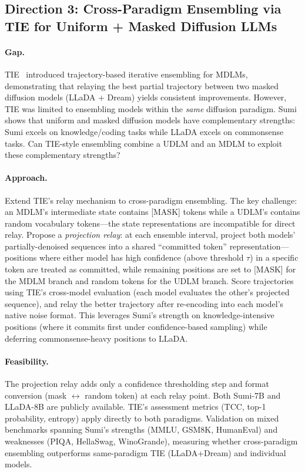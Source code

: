 \documentclass[11pt,a4paper]{article}
\begin{document}
\subsection{Direction 3: Cross-Paradigm Ensembling via TIE for Uniform + Masked Diffusion LLMs}

\paragraph{Gap.} TIE~\cite{yun2026tie} introduced trajectory-based iterative ensembling for MDLMs, demonstrating that relaying the best partial trajectory between two masked diffusion models (LLaDA + Dream) yields consistent improvements. However, TIE was limited to ensembling models within the \emph{same} diffusion paradigm. Sumi shows that uniform and masked diffusion models have complementary strengths: Sumi excels on knowledge/coding tasks while LLaDA excels on commonsense tasks. Can TIE-style ensembling combine a UDLM and an MDLM to exploit these complementary strengths?

\paragraph{Approach.} Extend TIE's relay mechanism to cross-paradigm ensembling. The key challenge: an MDLM's intermediate state contains [MASK] tokens while a UDLM's contains random vocabulary tokens---the state representations are incompatible for direct relay. Propose a \emph{projection relay}: at each ensemble interval, project both models' partially-denoised sequences into a shared ``committed token'' representation---positions where either model has high confidence (above threshold $\tau$) in a specific token are treated as committed, while remaining positions are set to [MASK] for the MDLM branch and random tokens for the UDLM branch. Score trajectories using TIE's cross-model evaluation (each model evaluates the other's projected sequence), and relay the better trajectory after re-encoding into each model's native noise format. This leverages Sumi's strength on knowledge-intensive positions (where it commits first under confidence-based sampling) while deferring commonsense-heavy positions to LLaDA.

\paragraph{Feasibility.} The projection relay adds only a confidence thresholding step and format conversion (mask $\leftrightarrow$ random token) at each relay point. Both Sumi-7B and LLaDA-8B are publicly available. TIE's assessment metrics (TCC, top-1 probability, entropy) apply directly to both paradigms. Validation on mixed benchmarks spanning Sumi's strengths (MMLU, GSM8K, HumanEval) and weaknesses (PIQA, HellaSwag, WinoGrande), measuring whether cross-paradigm ensembling outperforms same-paradigm TIE (LLaDA+Dream) and individual models.
\end{document}
